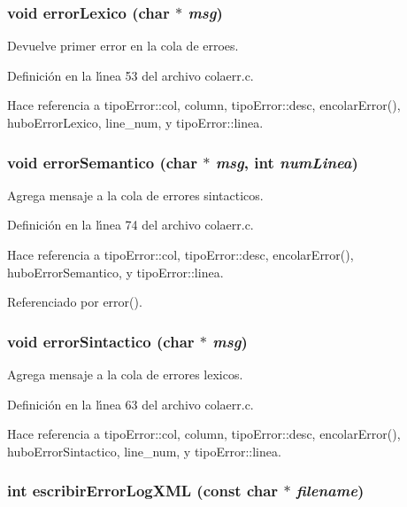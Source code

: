 \subsubsection{\setlength{\rightskip}{0pt plus 5cm}void error\-Lexico (char $\ast$ {\em msg})}\label{colaerr_8c_a9}


Devuelve primer error en la cola de erroes. 



Definici\'{o}n en la l\'{\i}nea 53 del archivo colaerr.c.

Hace referencia a tipo\-Error::col, column, tipo\-Error::desc, encolar\-Error(), hubo\-Error\-Lexico, line\_\-num, y tipo\-Error::linea.
\subsubsection{\setlength{\rightskip}{0pt plus 5cm}void error\-Semantico (char $\ast$ {\em msg}, int {\em num\-Linea})}\label{colaerr_8c_a11}


Agrega mensaje a la cola de errores sintacticos. 



Definici\'{o}n en la l\'{\i}nea 74 del archivo colaerr.c.

Hace referencia a tipo\-Error::col, tipo\-Error::desc, encolar\-Error(), hubo\-Error\-Semantico, y tipo\-Error::linea.

Referenciado por error().
\subsubsection{\setlength{\rightskip}{0pt plus 5cm}void error\-Sintactico (char $\ast$ {\em msg})}\label{colaerr_8c_a10}


Agrega mensaje a la cola de errores lexicos. 



Definici\'{o}n en la l\'{\i}nea 63 del archivo colaerr.c.

Hace referencia a tipo\-Error::col, column, tipo\-Error::desc, encolar\-Error(), hubo\-Error\-Sintactico, line\_\-num, y tipo\-Error::linea.
\subsubsection{\setlength{\rightskip}{0pt plus 5cm}int escribir\-Error\-Log\-XML (const char $\ast$ {\em filename})}\label{colaerr_8c_a12}


